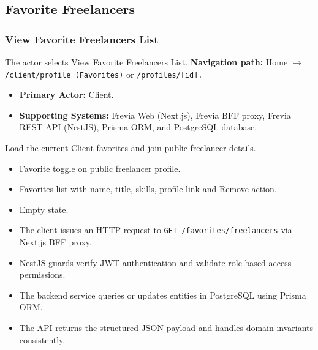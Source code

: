 \subsection{Favorite Freelancers}

\subsubsection{View Favorite Freelancers List}

The actor selects View Favorite Freelancers List.\newline
\textbf{Navigation path:} Home $\rightarrow$ \texttt{/\allowbreak{}client/\allowbreak{}profile (Favorites)} or \texttt{/\allowbreak{}profiles/\allowbreak{}[id].}


\begin{itemize}[leftmargin=1.6em,topsep=3pt,itemsep=2pt,parsep=0pt,label=$\bullet$]
    \item \textbf{Primary Actor:} Client.
    \item \textbf{Supporting Systems:} Frevia Web (Next.js), Frevia BFF proxy, Frevia REST API (NestJS), Prisma ORM, and PostgreSQL database.
\end{itemize}

\noindent Load the current Client favorites and join public freelancer details.

\begin{itemize}[leftmargin=1.6em,topsep=3pt,itemsep=2pt,parsep=0pt,label=$\bullet$]
    \item Favorite toggle on public freelancer profile.
    \item Favorites list with name, title, skills, profile link and Remove action.
    \item Empty state.
\end{itemize}

\begin{itemize}[leftmargin=1.6em,topsep=3pt,itemsep=2pt,parsep=0pt,label=$\bullet$]
    \item The client issues an HTTP request to \texttt{GET /\allowbreak{}favorites/\allowbreak{}freelancers} via Next.js BFF proxy.
    \item NestJS guards verify JWT authentication and validate role-based access permissions.
    \item The backend service queries or updates entities in PostgreSQL using Prisma ORM.
    \item The API returns the structured JSON payload and handles domain invariants consistently.
\end{itemize}

